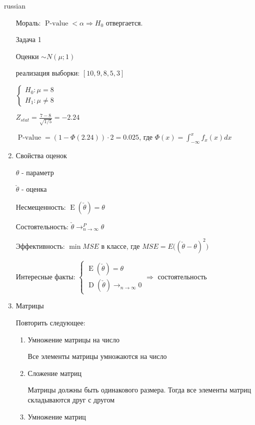\documentclass{article}
\begin{document}
\begin{otherlanguage*}{russian}
\begin{enumerate}
\begin{tikzpicture}
\end{tikzpicture}

Мораль: $\operatorname{P-value} < \alpha \Rightarrow H_0$ отвергается. 

Задача 1

Оценки $\sim N(\mu;1) $

реализация выборки: $ [10,9, 8, 5, 3]$

$\begin{cases}
H_0: \mu = 8 \\
H_1: \mu \ne 8 
\end{cases}$

$Z_{stat} = \frac{7-8}{\sqrt{1 / 5}} = - 2.24$ 

$\operatorname{P-value} = (1 - \Phi (2.24)) \cdot 2 = 0.025$, где $\Phi(x) = \int_{-\infty}^x f_x(x) dx$

\item Свойства оценок 

$\theta$ - параметр

$\check{\theta}$ - оценка

Несмещенность: $\operatorname{E} (\check{\theta}) = \theta $

Состоятельность: $\check{\theta} \rightarrow^P_{n \rightarrow \infty} \theta $

Эффективность: $\min MSE $ в классе, где $MSE = E \big( (\check{\theta} - \theta) ^ 2 \big)$

Интересные факты:
$
\begin{cases}
\operatorname{E} (\check{\theta}) = \theta \\ \operatorname{D} (\check{\theta}) \rightarrow_{n \rightarrow \infty} 0
\end{cases} \Rightarrow$ состоятельность

\item Матрицы

Повторить следующее: 

\begin{enumerate}
\item Умножение матрицы на число

Все элементы матрицы умножаются на число
\item Сложение матриц

Матрицы должны быть одинакового размера. Тогда все элементы матриц складываются друг с другом
\item Умножение матриц


\end{enumerate}
\end{enumerate}
\end{otherlanguage*}
\end{document}

